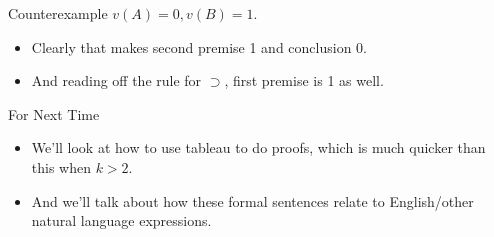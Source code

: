 \documentclass[
  17pt,
  letterpaper,
  ignorenonframetext,
  aspectratio=169,
  handout]{beamer}
\providecommand{\tightlist}{%
  \setlength{\itemsep}{0pt}\setlength{\parskip}{0pt}}\usepackage{longtable,booktabs,array}
\begin{document}
\begin{frame}{Counterexample}
\protect\hypertarget{counterexample}{}
\(v(A) = 0, v(B) = 1\).

\begin{itemize}[<+->]
\tightlist
\item
  Clearly that makes second premise 1 and conclusion 0.
\item
  And reading off the rule for \(\supset\), first premise is 1 as well.
\end{itemize}
\end{frame}

\begin{frame}{For Next Time}
\protect\hypertarget{for-next-time}{}
\begin{itemize}[<+->]
\tightlist
\item
  We'll look at how to use tableau to do proofs, which is much quicker
  than this when \(k > 2\).
\item
  And we'll talk about how these formal sentences relate to
  English/other natural language expressions.
\end{itemize}
\end{frame}
\end{document}
